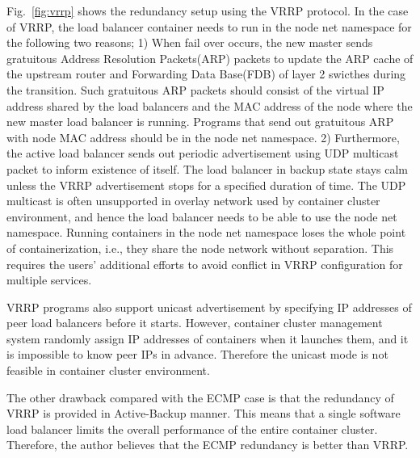 Fig.~\ref{fig:vrrp} shows the redundancy setup using the VRRP protocol.
In the case of VRRP, the load balancer container needs to run in the node net namespace for the following two reasons;
1) When fail over occurs, the new master sends gratuitous Address Resolution Packets(ARP) packets to update the ARP cache of the upstream router and Forwarding Data Base(FDB) of layer 2 swicthes during the transition.
Such gratuitous ARP packets should consist of the virtual IP address shared by the load balancers and the MAC address of the node where the new master load balancer is running.
Programs that send out gratuitous ARP with node MAC address should be in the node net namespace.
%
2) Furthermore, the active load balancer sends out periodic advertisement using UDP multicast packet to inform existence of itself.
The load balancer in backup state stays calm unless the VRRP advertisement stops for a specified duration of time.
The UDP multicast is often unsupported in overlay network used by container cluster environment, and hence the load balancer needs to be able to use the node net namespace.
%
Running containers in the node net namespace loses the whole point of containerization, i.e., they share the node network without separation.
This requires the users' additional efforts to avoid conflict in VRRP configuration for multiple services.
%

VRRP programs also support unicast advertisement by specifying IP addresses of peer load balancers before it starts.
However, container cluster management system randomly assign IP addresses of containers when it launches them, and it is impossible to know peer IPs in advance. 
Therefore the unicast mode is not feasible in container cluster environment.

The other drawback compared with the ECMP case is that the redundancy of VRRP is provided in Active-Backup manner.
This means that a single software load balancer limits the overall performance of the entire container cluster.
Therefore, the author believes that the ECMP redundancy is better than VRRP.



